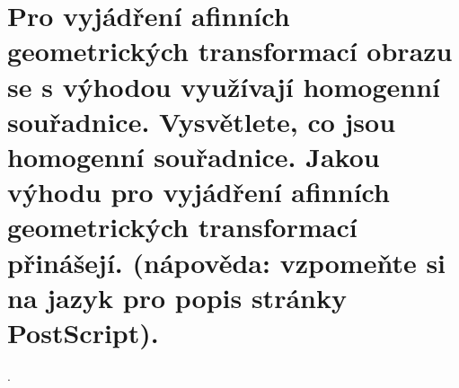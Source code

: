 \section{Pro vyjádření afinních geometrických transformací obrazu se s výhodou využívají homogenní souřadnice. 
Vysvětlete, co jsou homogenní souřadnice. Jakou výhodu pro vyjádření afinních geometrických transformací přinášejí. 
(nápověda: vzpomeňte si na jazyk pro popis stránky PostScript).}.
